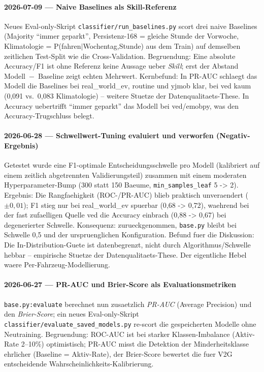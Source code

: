 \paragraph{2026-07-09 --- Naive Baselines als Skill-Referenz}
Neues Eval-only-Skript \texttt{classifier/run\_baselines.py} scort drei naive
Baselines (Majority ``immer geparkt'', Persistenz-168 = gleiche Stunde der
Vorwoche, Klimatologie = P(fahren$\mid$Wochentag,Stunde) aus dem Train) auf
demselben zeitlichen Test-Split wie die Cross-Validation. Begruendung: Eine
absolute Accuracy/F1 ist ohne Referenz keine Aussage ueber \emph{Skill}; erst
der Abstand Modell~$-$~Baseline zeigt echten Mehrwert. Kernbefund: In PR-AUC
schlaegt das Modell die Baselines bei real\_world\_ev, routine und yjmob klar,
bei ved kaum (0{,}091 vs.\ 0{,}083 Klimatologie) -- weitere Stuetze der
Datenqualitaets-These. In Accuracy uebertrifft ``immer geparkt'' das Modell bei
ved/emobpy, was den Accuracy-Trugschluss belegt.

\paragraph{2026-06-28 --- Schwellwert-Tuning evaluiert und verworfen (Negativ-Ergebnis)}
Getestet wurde eine F1-optimale Entscheidungsschwelle pro Modell (kalibriert auf
einem zeitlich abgetrennten Validierungsteil) zusammen mit einem moderaten
Hyperparameter-Bump (300 statt 150 Baeume, \texttt{min\_samples\_leaf} 5 -> 2).
Ergebnis: Die Rangfaehigkeit (ROC-/PR-AUC) blieb praktisch unveraendert
(\(\pm 0{,}01\)); F1 stieg nur bei real\_world\_ev spuerbar (0{,}68 -> 0{,}72),
waehrend bei der fast zufaelligen Quelle ved die Accuracy einbrach
(0{,}88 -> 0{,}67) bei degenerierter Schwelle. Konsequenz: zurueckgenommen,
\texttt{base.py} bleibt bei Schwelle 0{,}5 und der urspruenglichen
Konfiguration. Befund fuer die Diskussion: Die In-Distribution-Guete ist
datenbegrenzt, nicht durch Algorithmus/Schwelle hebbar -- empirische Stuetze der
Datenqualitaets-These. Der eigentliche Hebel waere Per-Fahrzeug-Modellierung.

\paragraph{2026-06-27 --- PR-AUC und Brier-Score als Evaluationsmetriken}
\texttt{base.py:evaluate} berechnet nun zusaetzlich \emph{PR-AUC}
(Average Precision) und den \emph{Brier-Score}; ein neues Eval-only-Skript
\texttt{classifier/evaluate\_saved\_models.py} re-scort die gespeicherten
Modelle ohne Neutraining. Begruendung: ROC-AUC ist bei starker Klassen-Imbalance
(Aktiv-Rate 2--10\%) optimistisch; PR-AUC misst die Detektion der
Minderheitsklasse ehrlicher (Baseline = Aktiv-Rate), der Brier-Score bewertet
die fuer V2G entscheidende Wahrscheinlichkeits-Kalibrierung.

